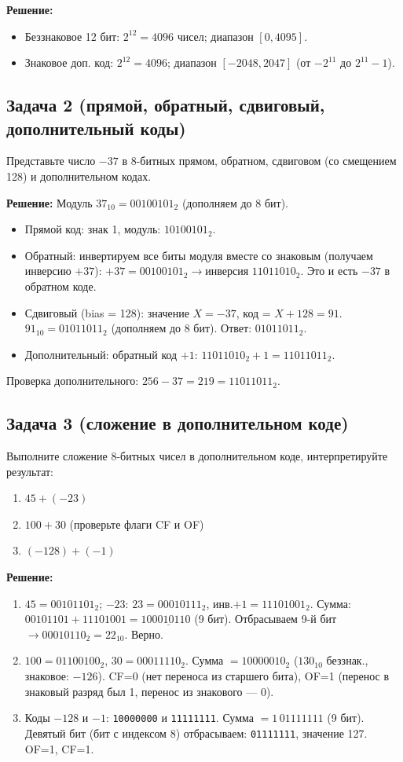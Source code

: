 \textbf{Решение:}
\begin{itemize}
    \item Беззнаковое 12 бит: $2^{12} = 4096$ чисел; диапазон $[0, 4095]$.
    \item Знаковое доп. код: $2^{12} = 4096$; диапазон $[-2048, 2047]$ (от $-2^{11}$ до $2^{11}-1$).
\end{itemize}

\subsection*{Задача 2 (прямой, обратный, сдвиговый, дополнительный коды)}
Представьте число $-37$ в 8-битных прямом, обратном, сдвиговом (со смещением 128) и дополнительном кодах.

\textbf{Решение:}
Модуль $37_{10} = 00100101_2$ (дополняем до 8 бит).
\begin{itemize}
    \item Прямой код: знак 1, модуль: $10100101_2$.
    \item Обратный: инвертируем все биты модуля вместе со знаковым (получаем инверсию $+37$): $+37 = 00100101_2 \to \text{инверсия } 11011010_2$. Это и есть $-37$ в обратном коде.
    \item Сдвиговый (bias = 128): значение $X = -37$, код = $X + 128 = 91$. $91_{10} = 01011011_2$ (дополняем до 8 бит). Ответ: $01011011_2$.
    \item Дополнительный: обратный код $+1$: $11011010_2 + 1 = 11011011_2$.
\end{itemize}

Проверка дополнительного: $256 - 37 = 219 = 11011011_2$.

\subsection*{Задача 3 (сложение в дополнительном коде)}
Выполните сложение 8-битных чисел в дополнительном коде, интерпретируйте результат:
\begin{enumerate}
    \item[a)] $45 + (-23)$
    \item[b)] $100 + 30$ (проверьте флаги CF и OF)
    \item[c)] $(-128) + (-1)$
\end{enumerate}

\textbf{Решение:}
\begin{enumerate}
    \item[a)] $45 = 00101101_2$; $-23$: $23=00010111_2$, инв.$+1=11101001_2$. Сумма: $00101101+11101001=1\underline{00010110}$ (9 бит). Отбрасываем 9-й бит $\to 00010110_2 = 22_{10}$. Верно.
    \item[b)] $100 = 01100100_2$, $30 = 00011110_2$. Сумма $= 10000010_2$ ($130_{10}$ беззнак., знаковое: $-126$). CF=0 (нет переноса из старшего бита), OF=1 (перенос в знаковый разряд был 1, перенос из знакового — 0).
    \item[c)] Коды $-128$ и $-1$: \texttt{10000000} и \texttt{11111111}.
    Сумма $=1\,01111111$ (9 бит). Девятый бит (бит с индексом 8)
    отбрасываем: \texttt{01111111}, значение 127. OF=1, CF=1.
\end{enumerate}

